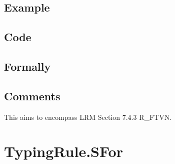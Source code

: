 \documentclass{book}
\begin{document}
  \subsection{Example}

  \subsection{Code}

\begin{emptyformal}
    \subsection{Formally}
\end{emptyformal}

\subsection{Comments}
    This aims to encompass LRM Section 7.4.3 R\_FTVN.

\section{TypingRule.SFor \label{sec:TypingRule.SFor}}
\end{document}
